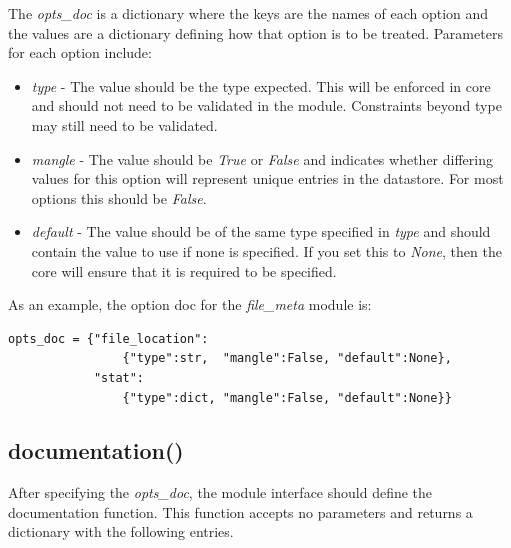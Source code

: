\documentclass{book}
\begin{document}
The \emph{opts\_doc} is a dictionary where the keys are the names of each option and the values are a dictionary defining how that option is to be treated.  Parameters for each option include:

\begin{itemize} \item \emph{type} - The value should be the type expected.  This will be enforced in core and should not need to be validated in the module.  Constraints beyond type may still need to be validated.
\item \emph{mangle} - The value should be \emph{True} or \emph{False} and indicates whether differing values for this option will represent unique entries in the datastore.  For most options this should be \emph{False}.
\item \emph{default} - The value should be of the same type specified in \emph{type} and should contain the value to use if none is specified.  If you set this to \emph{None}, then the core will ensure that it is required to be specified.
\end{itemize}

As an example, the option doc for the \emph{file\_meta} module is:
\begin{verbatim}
opts_doc = {"file_location":
                {"type":str,  "mangle":False, "default":None},
            "stat":
                {"type":dict, "mangle":False, "default":None}}
\end{verbatim}

\subsection{documentation()}
After specifying the \emph{opts\_doc}, the module interface should define the documentation function.  This function accepts no parameters and returns a dictionary with the following entries.
\end{document}
